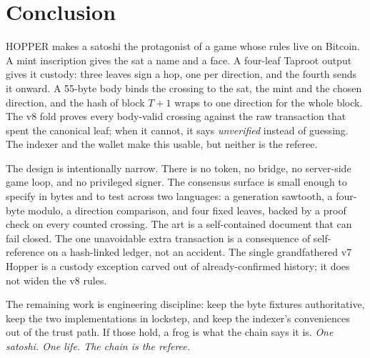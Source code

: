 \section{Conclusion}\label{sec:conclusion}

HOPPER makes a satoshi the protagonist of a game whose rules live on
Bitcoin. A mint inscription gives the sat a name and a face. A four-leaf
Taproot output gives it custody: three leaves sign a hop, one per direction,
and the fourth sends it onward. A 55-byte body binds the crossing to the sat,
the mint and the chosen direction, and the hash of block $T+1$ wraps to one
direction for the whole block. The v8 fold proves every body-valid crossing
against the raw transaction that spent the canonical leaf; when it cannot,
it says \emph{unverified} instead of guessing. The indexer and the wallet
make this usable, but neither is the referee.

The design is intentionally narrow. There is no token, no bridge, no
server-side game loop, and no privileged signer. The consensus surface is
small enough to specify in bytes and to test across two languages: a
generation sawtooth, a four-byte modulo, a direction comparison, and four
fixed leaves, backed by a proof check on every counted crossing. The art is a
self-contained document that can fail closed. The one unavoidable extra
transaction is a consequence of self-reference on a hash-linked ledger, not
an accident. The single grandfathered v7 Hopper is a custody exception
carved out of already-confirmed history; it does not widen the v8 rules.

The remaining work is engineering discipline: keep the byte fixtures
authoritative, keep the two implementations in lockstep, and keep the
indexer's conveniences out of the trust path. If those hold, a frog is what
the chain says it is. \textit{One satoshi. One life. The
chain is the referee.}
